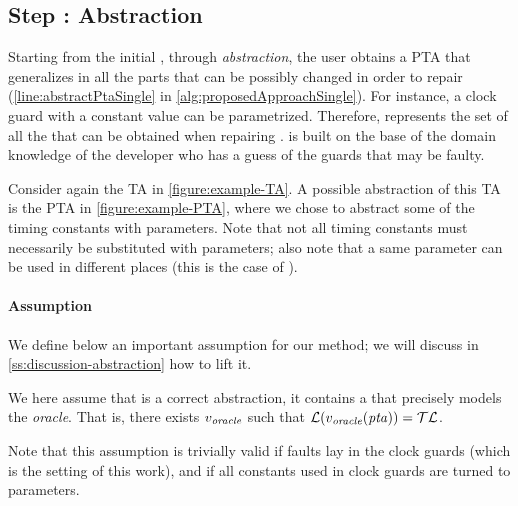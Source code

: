 \begin{tikzborder}{\cite{Gargantini16:validation}}
\begin{tikzborder}{\cite{gargantini_combinatorial_2017}}
\begin{tikzborder}{\cite{gargantini_combinatorial_2017}}
\begin{tikzborder}{\cite{garn2019}}
\begin{tikzborder}{\cite{arcaini2019achieving}}
\begin{tikzborder}{\cite{arcaini2019varivolution}}
\subsection{Step : Abstraction}\label{sec:abstraction}

\begin{tikzborder}{}
Starting from the initial \initTa, through \emph{abstraction}, the user obtains a PTA \ptaProc that generalizes \initTa in all the parts that can be possibly changed in order to repair \initTa (\ref{line:abstractPtaSingle} in \ref{alg:proposedApproachSingle}). For instance, a clock guard with a constant value can be parametrized. Therefore, \ptaProc represents the set of all the \tas that can be obtained when repairing \initTa. \ptaProc is built on the base of the domain knowledge of the developer who has a guess of the guards that may be faulty. 

\begin{example}
	Consider again the TA in \ref{figure:example-TA}.
	A possible abstraction of this TA is the PTA in \ref{figure:example-PTA}, where we chose to abstract some of the timing constants with parameters.
	Note that not all timing constants must necessarily be substituted with parameters; also note that a same parameter can be used in different places (this is the case of ).
\end{example}

\paragraph{Assumption}
We define below an important assumption for our method; we will discuss in \ref{ss:discussion-abstraction} how to lift it.

\begin{assumption}\label{assumption:oracle-in-pta}
	We here assume that \ptaProc is a correct abstraction, \ie{} it contains a \ta that precisely models the {\it oracle}.
	That is, there exists $v_{\mathit{oracle}}$ such that $\mathcal{L}(v_{\mathit{oracle}}(\mathit{pta})) = \mathcal{TL}$.
\end{assumption}

Note that this assumption is trivially valid if faults lay in the clock guards (which is the setting of this work), and if all constants used in clock guards are turned to parameters.
\end{tikzborder}


\end{tikzborder}
\end{tikzborder}
\end{tikzborder}
\end{tikzborder}
\end{tikzborder}
\end{tikzborder}
